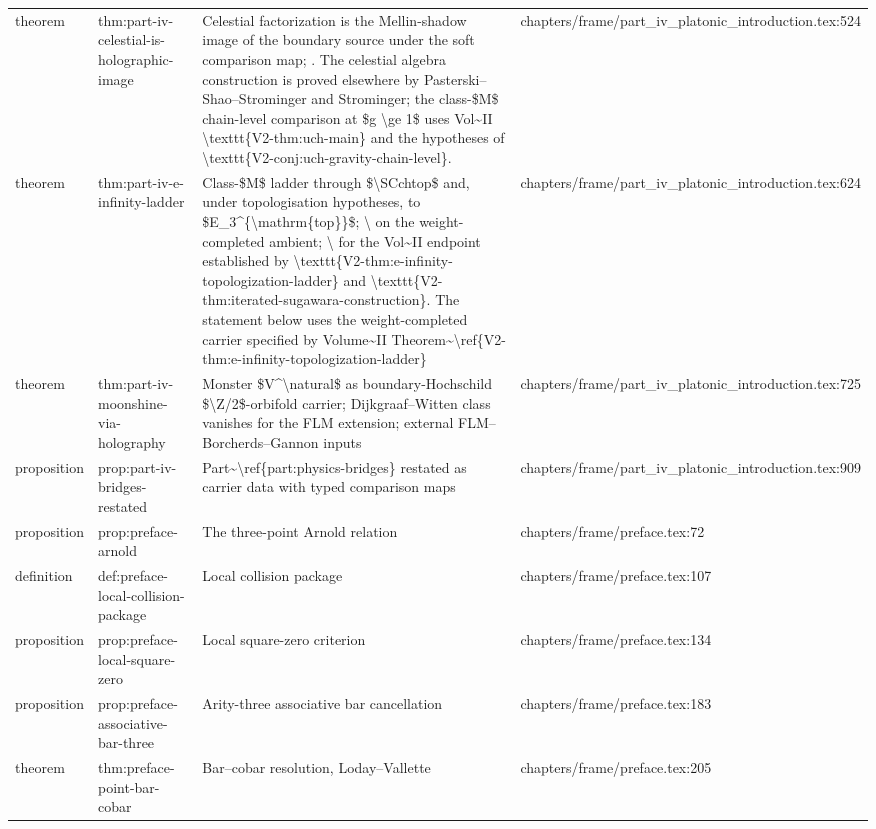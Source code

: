\documentclass[11pt]{article}
\begin{document}
\begin{longtable}{L{0.10\textwidth}L{0.26\textwidth}L{0.42\textwidth}L{0.22\textwidth}}
theorem & thm:part-iv-celestial-is-holographic-image & Celestial factorization is the Mellin-shadow image of the boundary source under the soft comparison map; . The celestial algebra construction is proved elsewhere by Pasterski--Shao--Strominger and Strominger; the class-\$M\$ chain-level comparison at \$g \textbackslash{}ge 1\$ uses Vol\textasciitilde{}II \textbackslash{}texttt\{V2-thm:uch-main\} and the hypotheses of \textbackslash{}texttt\{V2-conj:uch-gravity-chain-level\}. & chapters/frame/part\_iv\_platonic\_introduction.tex:524\\
theorem & thm:part-iv-e-infinity-ladder & Class-\$M\$ ladder through \$\textbackslash{}SCchtop\$ and, under topologisation hypotheses, to \$E\_3\textasciicircum{}\{\textbackslash{}mathrm\{top\}\}\$; \textbackslash{} on the weight-completed ambient; \textbackslash{} for the Vol\textasciitilde{}II endpoint established by \textbackslash{}texttt\{V2-thm:e-infinity-topologization-ladder\} and \textbackslash{}texttt\{V2-thm:iterated-sugawara-construction\}. The statement below uses the weight-completed carrier specified by Volume\textasciitilde{}II Theorem\textasciitilde{}\textbackslash{}ref\{V2-thm:e-infinity-topologization-ladder\} & chapters/frame/part\_iv\_platonic\_introduction.tex:624\\
theorem & thm:part-iv-moonshine-via-holography & Monster \$V\textasciicircum{}\textbackslash{}natural\$ as boundary-Hochschild \$\textbackslash{}Z/2\$-orbifold carrier; Dijkgraaf--Witten class vanishes for the FLM extension; external FLM--Borcherds--Gannon inputs & chapters/frame/part\_iv\_platonic\_introduction.tex:725\\
proposition & prop:part-iv-bridges-restated & Part\textasciitilde{}\textbackslash{}ref\{part:physics-bridges\} restated as carrier data with typed comparison maps & chapters/frame/part\_iv\_platonic\_introduction.tex:909\\
proposition & prop:preface-arnold & The three-point Arnold relation & chapters/frame/preface.tex:72\\
definition & def:preface-local-collision-package & Local collision package & chapters/frame/preface.tex:107\\
proposition & prop:preface-local-square-zero & Local square-zero criterion & chapters/frame/preface.tex:134\\
proposition & prop:preface-associative-bar-three & Arity-three associative bar cancellation & chapters/frame/preface.tex:183\\
theorem & thm:preface-point-bar-cobar & Bar--cobar resolution, Loday--Vallette & chapters/frame/preface.tex:205\\

\end{longtable}
\end{document}
